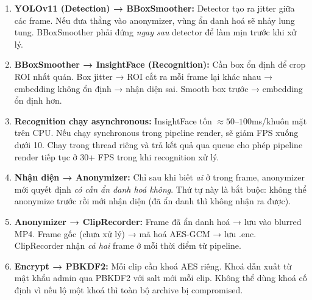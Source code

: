 \begin{enumerate}[1.]
    \item \textbf{YOLOv11 (Detection) → BBoxSmoother:} Detector tạo ra jitter giữa các frame. Nếu đưa thẳng vào anonymizer, vùng ẩn danh hoá sẽ nhảy lung tung. BBoxSmoother phải đứng \textit{ngay sau} detector để làm mịn trước khi xử lý.
    
    \item \textbf{BBoxSmoother → InsightFace (Recognition):} Cần box ổn định để crop ROI nhất quán. Box jitter → ROI cắt ra mỗi frame lại khác nhau → embedding không ổn định → nhận diện sai. Smooth box trước → embedding ổn định hơn.
    
    \item \textbf{Recognition chạy asynchronous:} InsightFace tốn $\approx 50$--$100$ms/khuôn mặt trên CPU. Nếu chạy synchronous trong pipeline render, sẽ giảm FPS xuống dưới 10. Chạy trong thread riêng và trả kết quả qua queue cho phép pipeline render tiếp tục ở 30+ FPS trong khi recognition xử lý.
    
    \item \textbf{Nhận diện → Anonymizer:} Chỉ sau khi biết \textit{ai} ở trong frame, anonymizer mới quyết định \textit{có cần ẩn danh hoá không}. Thứ tự này là bắt buộc: không thể anonymize trước rồi mới nhận diện (đã ẩn danh thì không nhận ra được).
    
    \item \textbf{Anonymizer → ClipRecorder:} Frame đã ẩn danh hoá → lưu vào blurred MP4. Frame gốc (chưa xử lý) → mã hoá AES-GCM → lưu .enc. ClipRecorder nhận \textit{cả hai} frame ở mỗi thời điểm từ pipeline.
    
    \item \textbf{Encrypt → PBKDF2:} Mỗi clip cần khoá AES riêng. Khoá dẫn xuất từ mật khẩu admin qua PBKDF2 với salt mới mỗi clip. Không thể dùng khoá cố định vì nếu lộ một khoá thì toàn bộ archive bị compromised.
\end{enumerate}

